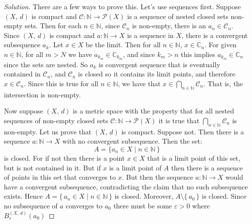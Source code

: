 \documentclass{article}
\theoremstyle{normal}
\begin{document}
    \begin{proof}[Solution]
        There are a few ways to prove this. Let's use sequences first.
        Suppose $(X,\,d)$ is compact and
        $\mathcal{C}:\mathbb{N}\rightarrow\mathcal{P}(X)$ is a sequence of
        nested closed sets non-empty sets. Then for each
        $n\in\mathbb{N}$, since $\mathcal{C}_{n}$ is non-empty, there is an
        $a_{n}\in\mathcal{C}_{n}$. Since $(X,\,d)$ is compact and
        $a:\mathbb{N}\rightarrow{X}$ is a sequence in $X$, there is a
        convergent subsequence $a_{k}$. Let $x\in{X}$ be the limit. Then
        for all $n\in\mathbb{N}$, $x\in\mathbb{C}_{n}$. For given
        $n\in\mathbb{N}$, for all $m>N$ we have
        $a_{k_{m}}\in\mathbb{C}_{k_{m}}$, and since $k_{m}>n$ this implies
        $a_{k_{m}}\in\mathbb{C}_{n}$ since the sets are nested. So
        $a_{k}$ is convergent sequence that is eventually contained in
        $\mathcal{C}_{n}$, and $\mathcal{C}_{n}$ is closed so it contains its
        limit points, and therefore $x\in\mathcal{C}_{n}$. Since this is true
        for all $n\in\mathbb{N}$, we have that
        $x\in\bigcap_{n\in\mathbb{N}}\mathcal{C}_{n}$. That is, the intersection
        is non-empty.
        \par\hfill\par
        Now suppose $(X,\,d)$ is a metric space with the property that for
        all nested sequences of non-empty closed sets
        $\mathcal{C}:\mathbb{N}\rightarrow\mathcal{P}(X)$ it is true that
        $\bigcap_{n\in\mathbb{N}}\mathcal{C}_{n}$ is non-empty. Let us prove
        that $(X,\,d)$ is compact. Suppose not. Then there is a sequence
        $a:\mathbb{N}\rightarrow{X}$ with no convergent subsequence. Then the
        set:
        \begin{equation}
            A=\{a_{n}\in{X}\;|\;n\in\mathbb{N}\,\}
        \end{equation}
        is closed. For if not then there is a point $x\in{X}$ that is a limit
        point of this set, but is not contained in it. But if $x$ is a
        limit point of $A$ then there is a sequence of points in this set that
        converges to $x$. But then the sequence
        $a:\mathbb{N}\rightarrow{X}$ would have a convergent subsequence,
        contradicting the claim that no such subsequence exists. Hence
        $A=\{\,a_{n}\in{X}\;|\;n\in\mathbb{N}\,\}$ is closed. Moreover,
        $A\setminus\{\,a_{0}\,\}$ is closed. Since no subsequence
        of $a$ converges to $a_{0}$ there must be some
        $\varepsilon>0$ where $B_{\varepsilon}^{(X,\,d)}(a_{0})$

\end{proof}
\end{document}
